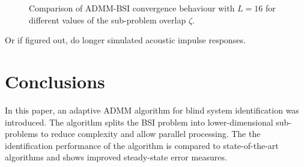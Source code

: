 \documentclass{article}
\begin{document}
\begin{figure}
    \centering
    \hspace*{-0.4cm}
    \hspace*{-0.5cm}
    \caption{Comparison of ADMM-BSI convergence behaviour with \(L\!=\!16\) for different values of the sub-problem overlap \(\zeta\).}
    \label{fig:perf_eval:NPM_over_time}
\end{figure}

\begin{attention}
    Or if figured out, do longer simulated acoustic impulse responses.
\end{attention}


\section{Conclusions}
\label{sec:conclusion}
In this paper, an adaptive ADMM algorithm for blind system identification was introduced.
The algorithm splits the BSI problem into lower-dimensional sub-problems to reduce complexity and allow parallel processing.
The the identification performance of the algorithm is compared to state-of-the-art algorithms and shows improved steady-state error measures.

% 
% 
\end{document}
